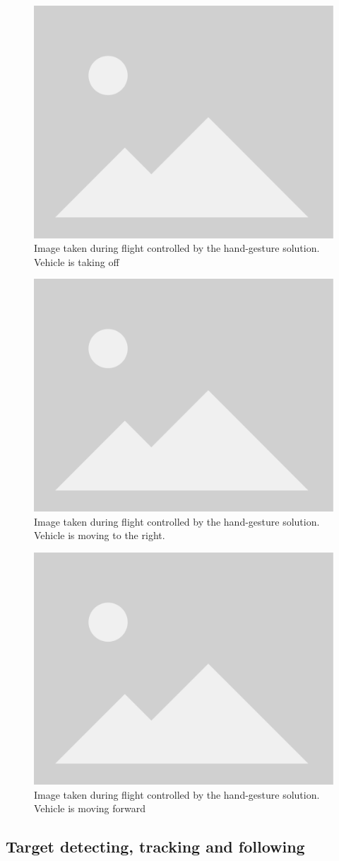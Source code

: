 \begin{figure}
  \centering
  \includegraphics[width=.6\textwidth, keepaspectratio]{img/placeholder.png}
  \caption{Image taken during flight controlled by the hand-gesture solution. Vehicle is taking off}\label{fig:flight-test-cam-onboard}
\end{figure}

\begin{figure}
  \centering
  \includegraphics[width=.6\textwidth, keepaspectratio]{img/placeholder.png}
  \caption{Image taken during flight controlled by the hand-gesture solution. Vehicle is moving to the right.}\label{fig:flight-test-cam-onboard}
\end{figure}

\begin{figure}
  \centering
  \includegraphics[width=.6\textwidth, keepaspectratio]{img/placeholder.png}
  \caption{Image taken during flight controlled by the hand-gesture solution. Vehicle is moving forward}\label{fig:flight-test-cam-onboard}
\end{figure}

\subsection{Target detecting, tracking and following}
\label{sec:test-10-follow}

